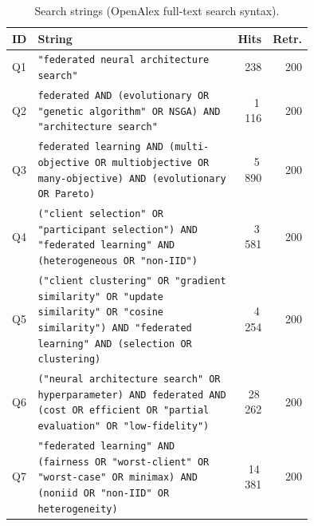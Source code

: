\documentclass[11pt,a4paper]{article}
\begin{document}
\begin{table}[H]\centering\small
\caption{Search strings (OpenAlex full-text search syntax).}\label{tab:queries}
\begin{tabular}{p{0.07\linewidth}p{0.68\linewidth}rr}\toprule
ID & String & Hits & Retr.\\\midrule
Q1 & \texttt{"federated neural architecture search"} & 238 & 200\\
Q2 & \texttt{federated AND (evolutionary OR "genetic algorithm" OR NSGA) AND "architecture search"} & 1\,116 & 200\\
Q3 & \texttt{federated learning AND (multi-objective OR multiobjective OR many-objective) AND (evolutionary OR Pareto)} & 5\,890 & 200\\
Q4 & \texttt{("client selection" OR "participant selection") AND "federated learning" AND (heterogeneous OR "non-IID")} & 3\,581 & 200\\
Q5 & \texttt{("client clustering" OR "gradient similarity" OR "update similarity" OR "cosine similarity") AND "federated learning" AND (selection OR clustering)} & 4\,254 & 200\\
Q6 & \texttt{("neural architecture search" OR hyperparameter) AND federated AND (cost OR efficient OR "partial evaluation" OR "low-fidelity")} & 28\,262 & 200\\
Q7 & \texttt{"federated learning" AND (fairness OR "worst-client" OR "worst-case" OR minimax) AND (noniid OR "non-IID" OR heterogeneity)} & 14\,381 & 200\\\bottomrule
\end{tabular}\end{table}
\end{document}
